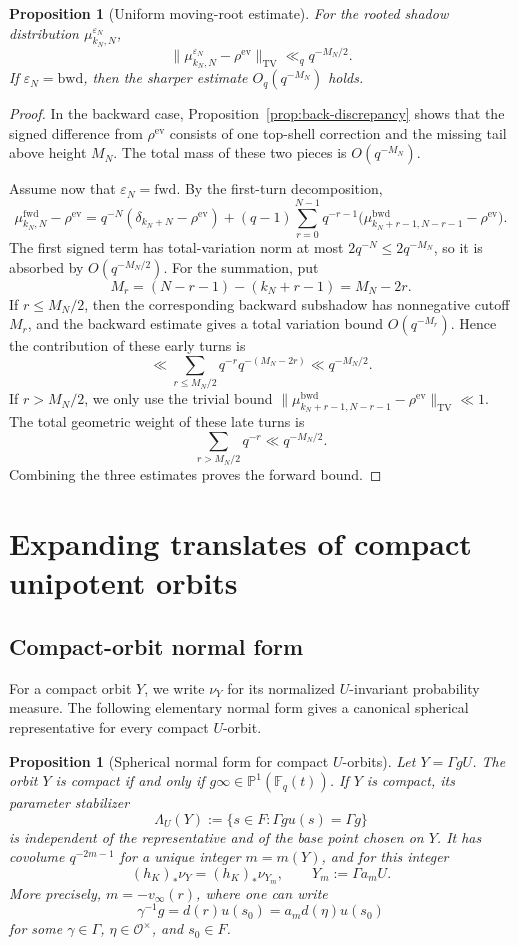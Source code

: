 \documentclass[11pt]{amsart}
\theoremstyle{definition}
\theoremstyle{plain}
\newtheorem{proposition}[definition]{Proposition}
\newcommand{\Fq}{\mathbb F_q}
\newcommand{\cO}{\mathcal O}
\newcommand{\TV}{\operatorname{TV}}
\newcommand{\fwd}{\mathrm{fwd}}
\newcommand{\bwd}{\mathrm{bwd}}
\newcommand{\ev}{\mathrm{ev}}
\begin{document}
\begin{proposition}[Uniform moving-root estimate]\label{prop:moving-TV}
For the rooted shadow distribution \(\mu^{\varepsilon_N}_{k_N,N}\),
\[
\|\mu^{\varepsilon_N}_{k_N,N}-\rho^{\ev}\|_{\TV}
\ll_q q^{-M_N/2}.
\]
If \(\varepsilon_N=\bwd\), then the sharper estimate \(O_q(q^{-M_N})\) holds.
\end{proposition}

\begin{proof}
In the backward case, Proposition~\ref{prop:back-discrepancy} shows that the
signed difference from \(\rho^{\ev}\) consists of one top-shell correction and the
missing tail above height \(M_N\).  The total mass of these two pieces is
\(O(q^{-M_N})\).

Assume now that \(\varepsilon_N=\fwd\).  By the first-turn decomposition,
\[
\mu^{\fwd}_{k_N,N}-\rho^{\ev}
=q^{-N}(\delta_{k_N+N}-\rho^{\ev})
 +(q-1)\sum_{r=0}^{N-1}q^{-r-1}
 \bigl(\mu^{\bwd}_{k_N+r-1,N-r-1}-\rho^{\ev}\bigr).
\]
The first signed term has total-variation norm at most
\(2q^{-N}\le2q^{-M_N}\), so it is absorbed by
\(O(q^{-M_N/2})\).  For the summation, put
\[
M_r=(N-r-1)-(k_N+r-1)=M_N-2r.
\]
If \(r\le M_N/2\), then the corresponding backward subshadow has nonnegative
cutoff \(M_r\), and the backward estimate gives a total variation bound
\(O(q^{-M_r})\).  Hence the contribution of these early turns is
\[
\ll \sum_{r\le M_N/2}q^{-r}q^{-(M_N-2r)}\ll q^{-M_N/2}.
\]
If \(r>M_N/2\), we only use the trivial bound
\(\|\mu^{\bwd}_{k_N+r-1,N-r-1}-\rho^{\ev}\|_{\TV}\ll1\).  The total geometric
weight of these late turns is
\[
\sum_{r>M_N/2}q^{-r}\ll q^{-M_N/2}.
\]
Combining the three estimates proves the forward bound.
\end{proof}

\section{Expanding translates of compact unipotent orbits}\label{sec:compact}

\subsection{Compact-orbit normal form}
For a compact orbit \(Y\), we write \(\nu_Y\) for its normalized
\(U\)-invariant probability measure.
The following elementary normal form gives a canonical spherical
representative for every compact \(U\)-orbit.

\begin{proposition}[Spherical normal form for compact \(U\)-orbits]
\label{prop:compact-normal-form}
Let \(Y=\Gamma gU\).  The orbit \(Y\) is compact if and only if
\(g\infty\in\mathbb P^1(\Fq(t))\).  If \(Y\) is compact, its parameter
stabilizer
\[
\Lambda_U(Y):=\{s\in F:\Gamma gu(s)=\Gamma g\}
\]
is independent of the representative and of the base point chosen on \(Y\).
It has covolume \(q^{-2m-1}\) for a unique integer \(m=m(Y)\), and for this
integer
\[
(h_K)_*\nu_Y=(h_K)_*\nu_{Y_m},
\qquad Y_m:=\Gamma a_mU.
\]
More precisely, \(m=-v_\infty(r)\), where one can write
\[
\gamma^{-1}g=d(r)u(s_0)=a_m d(\eta)u(s_0)
\]
for some \(\gamma\in\Gamma\), \(\eta\in\cO^\times\), and \(s_0\in F\).
\end{proposition}
\end{document}
